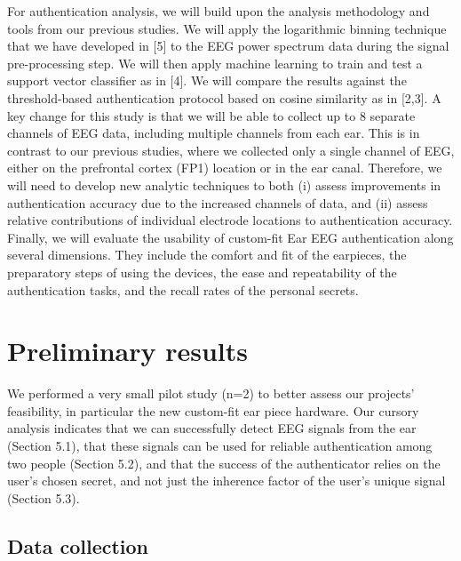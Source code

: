 \documentclass[11pt]{article}
\begin{document}
For authentication analysis, we will build upon the analysis methodology and
tools from our previous studies. We will apply the logarithmic binning technique
that we have developed in [5] to the EEG power spectrum data during the signal
pre-processing step. We will then apply machine learning to train and test a
support vector classifier as in [4]. We will compare the results against the
threshold-based authentication protocol based on cosine similarity as in [2,3].
A key change for this study is that we will be able to collect up to 8 separate
channels of EEG data, including multiple channels from each ear. This is in
contrast to our previous studies, where we collected only a single channel of
EEG, either on the prefrontal cortex (FP1) location or in the ear canal. Therefore,
we will need to develop new analytic techniques to both (i) assess improvements
in authentication accuracy due to the increased channels of data, and (ii) assess
relative contributions of individual electrode locations to authentication accuracy.
Finally, we will evaluate the usability of custom-fit Ear EEG authentication along
several dimensions. They include the comfort and fit of the earpieces, the
preparatory steps of using the devices, the ease and repeatability of the
authentication tasks, and the recall rates of the personal secrets.
\section{Preliminary results}
\label{sec:org914f392}

We performed a very small pilot study (n=2) to better assess our projects' feasibility,
in particular the new custom-fit ear piece hardware.
Our cursory analysis indicates that we can successfully
detect EEG signals from the ear (Section 5.1), that these signals can be used
for reliable authentication among two people (Section 5.2), and that the success
of the authenticator relies on the user's chosen secret, and not just the inherence
factor of the user's unique signal (Section 5.3).

\subsection{Data collection}
\label{sec:org20a2071}
\end{document}
